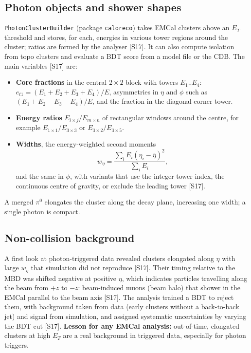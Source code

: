 \documentclass[11pt,letterpaper]{article}
\begin{document}
\subsection{Photon objects and shower shapes}
\texttt{PhotonClusterBuilder} (package \texttt{caloreco}) takes EMCal clusters above an $E_T$ threshold and stores, for each, energies in various tower regions around the cluster;
ratios are formed by the analyser [S17]. It can also compute isolation from topo clusters and evaluate a BDT score from a model file or the CDB.
The main variables [S17] are:
\begin{itemize}
\item \textbf{Core fractions} in the central $2\times2$ block with towers $E_1..E_4$: $e_{t1}=(E_1+E_2+E_3+E_4)/E$, asymmetries in $\eta$ and $\phi$ such as $(E_1+E_2-E_3-E_4)/E$, and the fraction in the diagonal corner tower.
\item \textbf{Energy ratios} $E_{i\times j}/E_{m\times n}$ of rectangular windows around the centre, for example $E_{1\times1}/E_{3\times3}$ or $E_{3\times2}/E_{3\times5}$.
\item \textbf{Widths}, the energy-weighted second moments
\begin{equation}
w_\eta = \frac{\sum_i E_i(\eta_i-\bar\eta)^2}{\sum_iE_i},
\end{equation}
and the same in $\phi$, with variants that use the integer tower index, the continuous centre of gravity, or exclude the leading tower [S17].
\end{itemize}
A merged $\pi^0$ elongates the cluster along the decay plane, increasing one width; a single photon is compact.

\subsection{Non-collision background}\label{sec:ncb}
A first look at photon-triggered data revealed clusters elongated along $\eta$ with large $w_\eta$ that simulation did not reproduce [S17].
Their timing relative to the MBD was shifted negative at positive $\eta$, which indicates particles travelling along the beam from $+z$ to $-z$:
beam-induced muons (beam halo) that shower in the EMCal parallel to the beam axis [S17].
The analysis trained a BDT to reject them, with background taken from data (early clusters without a back-to-back jet) and signal from simulation, and assigned systematic uncertainties by varying the BDT cut [S17].
\textbf{Lesson for any EMCal analysis:} out-of-time, elongated clusters at high $E_T$ are a real background in triggered data, especially for photon triggers.
\end{document}
